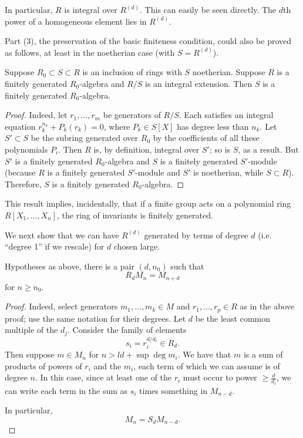 In particular, $R$ is integral over $R^{(d)}$. This can easily be seen
directly. The $d$th power of a homogeneous element lies in $R^{(d)}$.  
\begin{remark} 
Part (3), the preservation of the basic finiteness condition, could also be
proved as follows, at least in the noetherian case (with $S = R^{(d)}$). 
\begin{lemma} 
Suppose $R_0 \subset S \subset R$ is an inclusion of rings with $S$ noetherian.
Suppose $R$ is a
finitely generated $R_0$-algebra and $R/S$ is an integral extension. Then $S$
is a finitely generated $R_0$-algebra.
\end{lemma} 
\begin{proof} 
Indeed, let $r_1, \dots, r_m$ be generators of $R/S$. Each satisfies an
integral equation $r_k^{n_k} + P_k(r_k) = 0$, where $P_k \in S[X]$ has degree
less than $n_k$. Let $S' \subset S$ be the subring generated over $R_0$ by the
coefficients of all these polynomials $P_i$.  
Then $R$ is, by definition, integral over $S'$; so is $S$, as a result. But
$S'$ is a finitely generated $R_0$-algebra and $S$ is a finitely generated
$S'$-module (because $R$ is a finitely generated $S'$-module and $S'$ is
noetherian, while $S \subset R$). Therefore, $S$ is a finitely generated
$R_0$-algebra.
\end{proof} 
This result implies, incidentally, that if a finite group acts on a polynomial
ring $R[X_1, \dots, X_n]$, the ring of invariants is finitely generated.
\end{remark} 

We next show that we can have $R^{(d)}$ generated by terms of degree $d$ (i.e.
``degree 1'' if we rescale) for $d$ chosen large.
\begin{lemma} 
Hypotheses as above, there is a pair $(d, n_0)$ such that
\[  R_d M_n = M_{n+d}  \]
for $n \geq n_0$.
\end{lemma} 
\begin{proof} 
Indeed, select generators $m_1, \dots, m_k \in M$ and $r_1, \dots, r_p \in R$
as in the above proof; use the same notation for their degrees.
Let $d $ be the least common multiple of the $d_j$.  Consider the family of
elements
\[  s_i = r_i^{d/d_i} \in R_d. \]
Then suppose $m \in M_n$ for $n>ld + \sup \deg m_i$.  We have that $m$ is a sum
of products of powers of $r_i$ and the $m_i$, each term of which we can assume
is
of degree $n$.  In this case, since at least one
of the $r_i$ must occur to power $\geq \frac{d}{d_i}$, we can write each term
in the sum as $s_i$ times something in $M_{n-d}$. 

In particular,
\[ M_n  = S_d M_{n-d}.  \]
\end{proof} 

